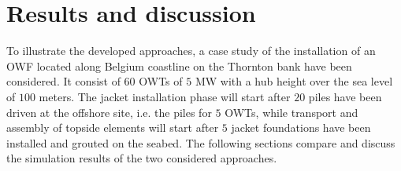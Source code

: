 \section{Results and discussion}
\label{results}
To illustrate the developed approaches, a case study of the installation of an OWF located along Belgium coastline on the Thornton bank have been considered. It consist of $60$ OWTs of $5$ MW with a hub height over the sea level of $100$ meters.
The jacket installation phase will start after $20$ piles have been driven at the offshore site, i.e. the piles for $5$ OWTs, while transport and assembly of topside elements will start after $5$ jacket foundations have been installed and grouted on the seabed.
The following sections compare and discuss the simulation results of the two considered approaches.